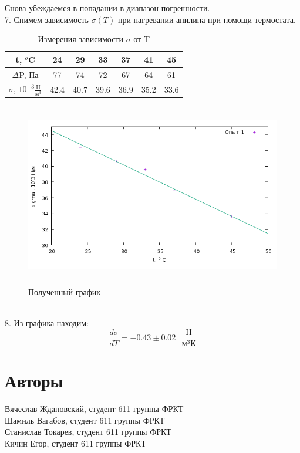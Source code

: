 \documentclass[a4paper]{article}
\begin{document}
	Снова убеждаемся в попадании в диапазон погрешности. \\
	7. Снимем зависимость $\sigma (T)$ при нагревании анилина при помощи термостата. \\
	\begin{table}[h!]
 		\centering
	\begin{tabular}{|c|c|c|c|c|c|c|}
	\hline
t, $^o$C & 24 & 29 & 33 & 37 & 41 & 45 \\
\hline
$\Delta$P, Па& 77&	74&	72&	67&	64&	61	\\
\hline
$\sigma$, $10^{-3} \frac{\text{Н}}{\text{м}^3}$ & 42.4 & 40.7 &	39.6& 36.9 & 35.2 & 33.6 \\
\hline
    	\end{tabular}
  		\caption{Измерения зависимости $\sigma$ от T}
	\end{table}
	\begin{figure}[ht!]
		\centering
		\includegraphics[height=80mm]{pic2.png}
		\caption{Полученный график \label{overflow}}
	\end{figure}
	\\8. Из графика находим:
	\begin{equation}
	\frac{d\sigma}{dT}=-0.43 \pm 0.02 \text{ }\frac{\text{Н}}{\text{м}^3\text{К}}
	\end{equation}
	\section{Авторы} Вячеслав Ждановский, студент 611 группы ФРКТ\\
Шамиль Вагабов, студент 611 группы ФРКТ\\
Станислав Токарев, студент 611 группы ФРКТ\\
Кичин Егор, студент 611 группы ФРКТ
\end{document}
